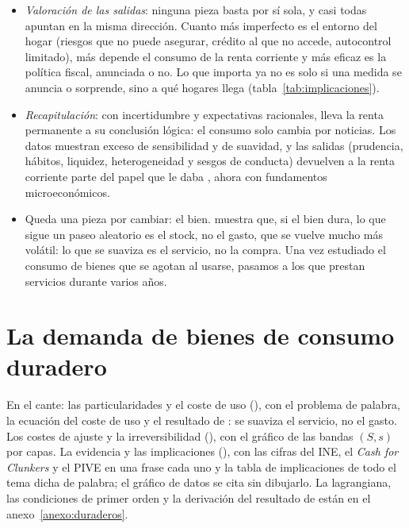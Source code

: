 \documentclass[11pt]{article}
\begin{document}
\begin{itemize}
\item \emph{Valoración de las salidas}: ninguna pieza basta por sí sola, y casi todas apuntan en la misma dirección. Cuanto más imperfecto es el entorno del hogar (riesgos que no puede asegurar, crédito al que no accede, autocontrol limitado), más depende el consumo de la renta corriente y más eficaz es la política fiscal, anunciada o no. Lo que importa ya no es solo si una medida se anuncia o sorprende, sino a qué hogares llega (tabla~\ref{tab:implicaciones}).
\item \emph{Recapitulación}: con incertidumbre y expectativas racionales,  lleva la renta permanente a su conclusión lógica: el consumo solo cambia por noticias. Los datos muestran exceso de sensibilidad y de suavidad, y las salidas (prudencia, hábitos, liquidez, heterogeneidad y sesgos de conducta) devuelven a la renta corriente parte del papel que le daba , ahora con fundamentos microeconómicos.
\item Queda una pieza por cambiar: el bien. \textcite{Mankiw1982Hall} muestra que, si el bien dura, lo que sigue un paseo aleatorio es el stock, no el gasto, que se vuelve mucho más volátil: lo que se suaviza es el servicio, no la compra. Una vez estudiado el consumo de bienes que se agotan al usarse, pasamos a los que prestan servicios durante varios años.
\end{itemize}

\section{La demanda de bienes de consumo duradero}\label{sec:duraderos}

\begin{notaopositor}
En el cante: las particularidades y el coste de uso (), con el problema de palabra, la ecuación del coste de uso y el resultado de : se suaviza el servicio, no el gasto. Los costes de ajuste y la irreversibilidad (), con el gráfico de las bandas $(S,s)$ por capas. La evidencia y las implicaciones (), con las cifras del INE, el \emph{Cash for Clunkers} y el PIVE en una frase cada uno y la tabla de implicaciones de todo el tema dicha de palabra; el gráfico de datos se cita sin dibujarlo. La lagrangiana, las condiciones de primer orden y la derivación del resultado de  están en el anexo~\ref{anexo:duraderos}.
\end{notaopositor}
\end{document}
